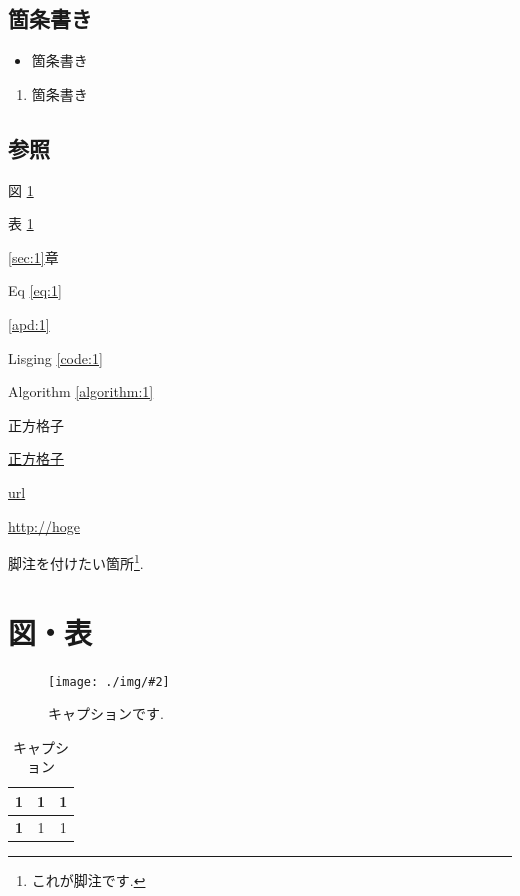 \documentclass[11pt,a4paper, titlepage]{ltjsarticle}
\let\origsection\section
\let\origsubsection\subsection
\newcommand{\chapter}{\origsection}
\renewcommand{\section}{\origsubsection}
\renewcommand{\subsection}{\subsubsection}
\renewcommand{\figurename}{図 }
\renewcommand{\tablename}{表 }
\newcommand{\記}{\begin{center} 記 \end{center}}
\newcommand{\挨拶}{\noindent 拝啓 \ifcase\month\or 厳寒\or 春寒\or 早春
    \or 陽寒\or 新緑\or 向暑\or 猛暑\or 残暑\or 初秋\or 仲秋\or 晩秋\or 初冬
    \fi の候, ますますご清栄のこととお喜び申し上げます.}
\newcommand{\refSec}[1]   {\ref{#1}章}
\newcommand{\refApd}[1]   {\ref{#1}}
\newcommand{\refFig}[1]   {\figurename\ref{#1}}
\newcommand{\refTable}[1] {\tablename\ref{#1}}
\newcommand{\refEq}[1]    {Eq \ref{#1}}
\newcommand{\refCode}[1]    {Lisging \ref{#1}}
\newcommand{\refAlgorithm}[1]    {Algorithm \ref{#1}}
\newcommand{\myfig}[3]{\begin{figure}[H]\centering\texttt{[image: ./img/\#2]}\caption{#3\label{fig:#2}}\end{figure}}
\newcommand{\mytable}[5]{\begin{table}[H] \centering 
    \renewcommand{\arraystretch}{0.8} \begin{tabular}{#1} 
        \toprule #2 \midrule #3 \bottomrule \end{tabular} 
        \caption{#4 \label{#5}} \renewcommand{\arraystretch}{1} \end{table}}
\begin{document}
\section{箇条書き}
\begin{itemize}
    \item 箇条書き
\end{itemize}

\begin{enumerate}
    \item 箇条書き
\end{enumerate}

\section{参照}
\refFig{fig:template.png}\par
\refTable{table:1}\par
\refSec{sec:1}\par
\refEq{eq:1}\par
\refApd{apd:1}\par
\refCode{code:1}\par
\refAlgorithm{algorithm:1} \par
\hypertarget{square}{正方格子}\par
\hyperlink{square}{正方格子}\par
\href{http://hoge}{url}\par
\url{http://hoge}\par
\cite{Plumer_1988} \par
\cite{Plumer_1989} \par
脚注を付けたい箇所\footnote{これが脚注です.}.
\chapter{図・表}
\myfig{12}{template.png}{キャプションです.}
\mytable{lcc}
{\textbf{1} & \textbf{1} & \textbf{1} \\ }
{\textbf{1} & 1  & 1  \\ }
{キャプション}
{table:1}
\end{document}

